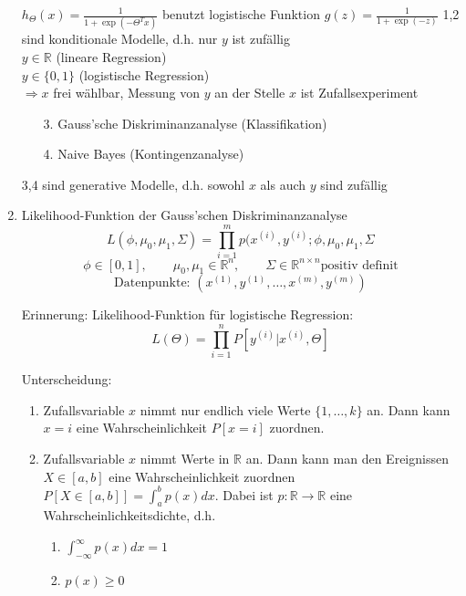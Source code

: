 \begin{enumerate}[(1)]
$h_\Theta(x) = \frac{1}{1+\exp(-\Theta^T x)}$ benutzt logistische Funktion $g(z) = \frac{1}{1+\exp(-z)}$
1,2 sind konditionale Modelle, d.h. nur $y$ ist zufällig\\
$y \in \mathbb{R}$ (lineare Regression)\\
$y \in \{0,1\}$ (logistische Regression)\\
$\Rightarrow x$ frei wählbar, Messung von $y$ an der Stelle $x$ ist Zufallsexperiment

\begin{enumerate}
\item[3.] Gauss'sche Diskriminanzanalyse (Klassifikation)
\item[4.] Naive Bayes (Kontingenzanalyse)
\end{enumerate}

3,4 sind generative Modelle, d.h. sowohl $x$ als auch $y$ sind zufällig
\item Likelihood-Funktion der Gauss'schen Diskriminanzanalyse
\[L(\phi,\mu_0, \mu_1, \Sigma) = \prod^m_{i=1} p(x^{(i)},y^{(i)};\phi,\mu_0, \mu_1, \Sigma\]
\[\phi \in [0,1], \quad\quad \mu_0, \mu_1 \in \mathbb{R}^n, \quad\quad \Sigma \in \mathbb{R}^{n \times n} \text{positiv definit}\]
\[\text{Datenpunkte: } (x^{(1)},y^{(1)}, \dots , x^{(m)},y^{(m)})\]

\begin{framed}
Erinnerung: Likelihood-Funktion für logistische Regression:
\[L(\Theta) = \prod^n_{i=1} P[y^{(i)} | x^{(i)}, \Theta]\]
\end{framed}

\begin{framed}
Unterscheidung:
\begin{enumerate}[1.]
\item Zufallsvariable $x$ nimmt nur endlich viele Werte $\{1, \dots , k\}$ an. Dann kann $x = i$ eine Wahrscheinlichkeit $P[x = i]$ zuordnen.
\item Zufallsvariable $x$ nimmt Werte in $\mathbb{R}$ an. Dann kann man den Ereignissen $X \in [a,b]$ eine Wahrscheinlichkeit zuordnen $P[X \in [a,b]] = \int^b_a p(x) dx$. Dabei ist $p:\mathbb{R} \rightarrow \mathbb{R}$ eine Wahrscheinlichkeitsdichte, d.h.

\begin{enumerate}[(1.)]
\item $\int^\infty_{- \infty} p(x) dx = 1$
\item $p(x) \geq 0$
\end{enumerate}
\end{enumerate}
\end{framed}

\end{enumerate}